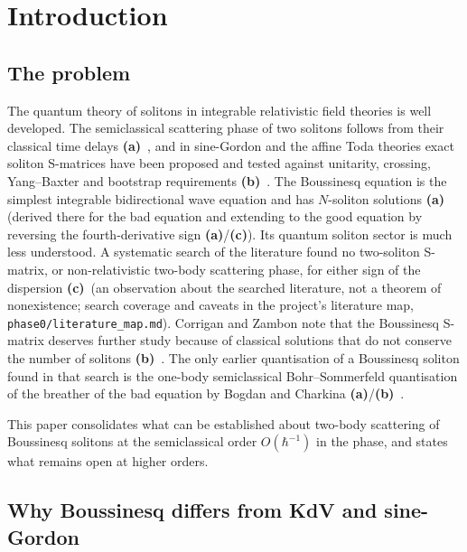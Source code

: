\documentclass[11pt,a4paper]{article}
\newcommand{\lab}[1]{{\normalfont\sffamily\footnotesize\bfseries(#1)}}
\newcommand{\La}{\lab{a}}
\newcommand{\Lb}{\lab{b}}
\newcommand{\Lc}{\lab{c}}
\newcommand{\hb}{\hbar}
\theoremstyle{remark}
\begin{document}
\tableofcontents

\section{Introduction}\label{sec:intro}

\subsection{The problem}

The quantum theory of solitons in integrable relativistic field theories is well developed. The semiclassical scattering phase of two solitons follows from their classical time delays \La~\cite{FK}, and in sine-Gordon and the affine Toda theories exact soliton S-matrices have been proposed and tested against unitarity, crossing, Yang--Baxter and bootstrap requirements \Lb~\cite{Hol93,Johnson,Gand}. The Boussinesq equation is the simplest integrable bidirectional wave equation and has $N$-soliton solutions \La~\cite{Hirota73} (derived there for the bad equation and extending to the good equation by reversing the fourth-derivative sign \La/\Lc). Its quantum soliton sector is much less understood. A systematic search of the literature found no two-soliton S-matrix, or non-relativistic two-body scattering phase, for either sign of the dispersion \Lc\ (an observation about the searched literature, not a theorem of nonexistence; search coverage and caveats in the project's literature map, \texttt{phase0/literature\_map.md}). Corrigan and Zambon note that the Boussinesq S-matrix deserves further study because of classical solutions that do not conserve the number of solitons \Lb~\cite[\S6]{CZ}. The only earlier quantisation of a Boussinesq soliton found in that search is the one-body semiclassical Bohr--Sommerfeld quantisation of the breather of the bad equation by Bogdan and Charkina \La/\Lb~\cite{BC}.

This paper consolidates what can be established about two-body scattering of Boussinesq solitons at the semiclassical order $O(\hb^{-1})$ in the phase, and states what remains open at higher orders.

\subsection{Why Boussinesq differs from KdV and sine-Gordon}\label{sec:differs}
\end{document}
